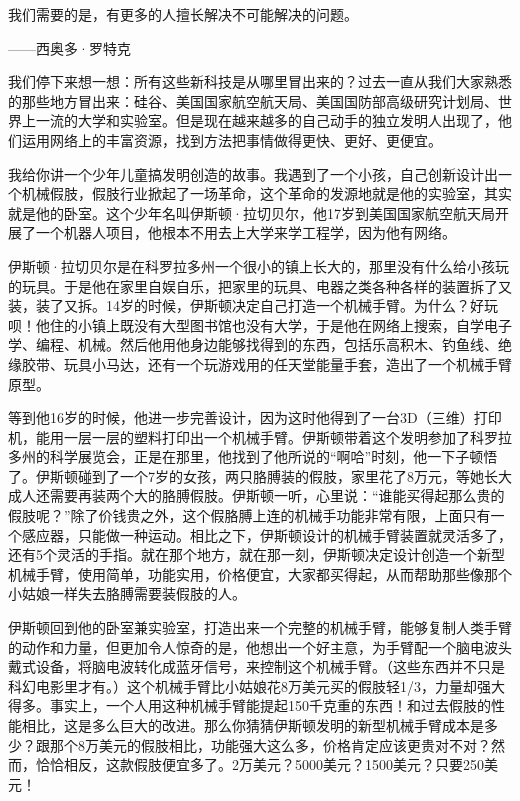 \begin{BookQuote}
我们需要的是，有更多的人擅长解决不可能解决的问题。

\hfill ——西奥多·罗特克
\end{BookQuote}

我们停下来想一想：所有这些新科技是从哪里冒出来的？过去一直从我们大家熟悉的那些地方冒出来：硅谷、美国国家航空航天局、美国国防部高级研究计划局、世界上一流的大学和实验室。但是现在越来越多的自己动手的独立发明人出现了，他们运用网络上的丰富资源，找到方法把事情做得更快、更好、更便宜。

我给你讲一个少年儿童搞发明创造的故事。我遇到了一个小孩，自己创新设计出一个机械假肢，假肢行业掀起了一场革命，这个革命的发源地就是他的实验室，其实就是他的卧室。这个少年名叫伊斯顿·拉切贝尔，他17岁到美国国家航空航天局开展了一个机器人项目，他根本不用去上大学来学工程学，因为他有网络。

伊斯顿·拉切贝尔是在科罗拉多州一个很小的镇上长大的，那里没有什么给小孩玩的玩具。于是他在家里自娱自乐，把家里的玩具、电器之类各种各样的装置拆了又装，装了又拆。14岁的时候，伊斯顿决定自己打造一个机械手臂。为什么？好玩呗！他住的小镇上既没有大型图书馆也没有大学，于是他在网络上搜索，自学电子学、编程、机械。然后他用他身边能够找得到的东西，包括乐高积木、钓鱼线、绝缘胶带、玩具小马达，还有一个玩游戏用的任天堂能量手套，造出了一个机械手臂原型。

等到他16岁的时候，他进一步完善设计，因为这时他得到了一台3D（三维）打印机，能用一层一层的塑料打印出一个机械手臂。伊斯顿带着这个发明参加了科罗拉多州的科学展览会，正是在那里，他找到了他所说的“啊哈”时刻，他一下子顿悟了。伊斯顿碰到了一个7岁的女孩，两只胳膊装的假肢，家里花了8万元，等她长大成人还需要再装两个大的胳膊假肢。伊斯顿一听，心里说：“谁能买得起那么贵的假肢呢？”除了价钱贵之外，这个假胳膊上连的机械手功能非常有限，上面只有一个感应器，只能做一种运动。相比之下，伊斯顿设计的机械手臂装置就灵活多了，还有5个灵活的手指。就在那个地方，就在那一刻，伊斯顿决定设计创造一个新型机械手臂，使用简单，功能实用，价格便宜，大家都买得起，从而帮助那些像那个小姑娘一样失去胳膊需要装假肢的人。

伊斯顿回到他的卧室兼实验室，打造出来一个完整的机械手臂，能够复制人类手臂的动作和力量，但更加令人惊奇的是，他想出一个好主意，为手臂配一个脑电波头戴式设备，将脑电波转化成蓝牙信号，来控制这个机械手臂。（这些东西并不只是科幻电影里才有。）这个机械手臂比小姑娘花8万美元买的假肢轻1/3，力量却强大得多。事实上，一个人用这种机械手臂能提起150千克重的东西！和过去假肢的性能相比，这是多么巨大的改进。那么你猜猜伊斯顿发明的新型机械手臂成本是多少？跟那个8万美元的假肢相比，功能强大这么多，价格肯定应该更贵对不对？然而，恰恰相反，这款假肢便宜多了。2万美元？5000美元？1500美元？只要250美元！

